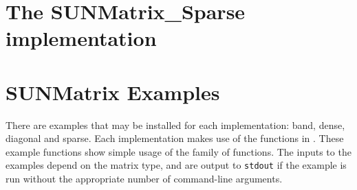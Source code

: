 \section{The SUNMatrix\_Sparse implementation}\label{ss:sunmat_sparse}



\section{SUNMatrix Examples}\label{ss:sunmat_examples}

There are  examples that may be installed for each
implementation: band, dense, diagonal and sparse.  Each implementation
makes use of the functions in . 
These example functions show simple usage of the  family
of functions.  The inputs to the examples depend on the matrix type,
and are output to \texttt{stdout} if the example is run without the
appropriate number of command-line arguments. 

